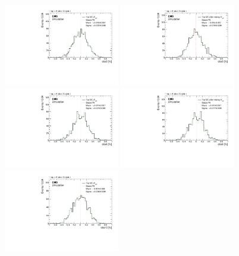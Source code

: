 \begin{figure}
    \centering
    \includegraphics[width=0.45\textwidth]{figure/SimAcp_RunII_co_obs3.pdf}
    \includegraphics[width=0.45\textwidth]{figure/SimAcp_RunII_co_obs3_mixed.pdf}
    \includegraphics[width=0.45\textwidth]{figure/SimAcp_RunII_co_obs6.pdf}
    \includegraphics[width=0.45\textwidth]{figure/SimAcp_RunII_co_obs6_mixed.pdf}
    \includegraphics[width=0.45\textwidth]{figure/SimAcp_RunII_co_obs12.pdf}

\end{figure}
